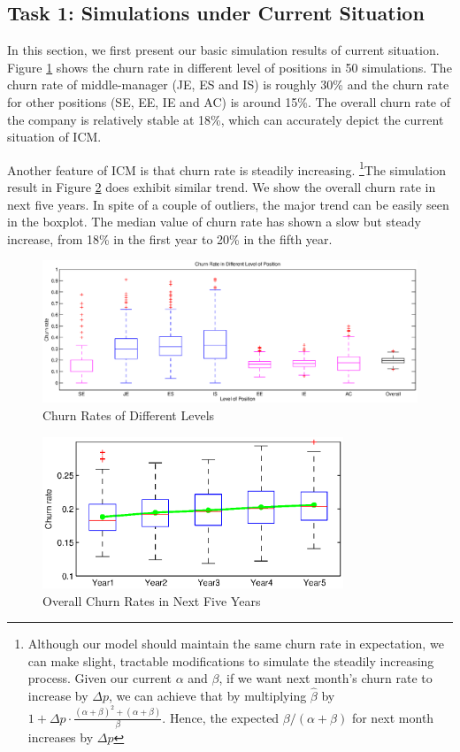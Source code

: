 \documentclass[tcn = 37075, sheet = false, abstract = false]{mcmthesis}
\begin{document}
\subsection{Task 1: Simulations under Current Situation}

In this section, we first present our basic simulation results of current situation. Figure \ref{fig:cdl} shows the churn rate in different level of positions in 50 simulations. The churn rate of middle-manager (JE, ES and IS) is roughly 30\% and the churn rate for other positions (SE, EE, IE and AC) is around 15\%. The overall churn rate of the company is relatively stable at 18\%, which can accurately depict the current situation of ICM.

Another feature of ICM is that churn rate is steadily increasing. \footnote{Although our model should maintain the same churn rate in expectation, we can make slight, tractable modifications to simulate the steadily increasing process. Given our current $\alpha$ and $\beta$, if we want next month's churn rate to increase by $\Delta p$, we can achieve that by multiplying $\hat{\beta}$ by  $1 + \Delta p \cdot \frac{(\alpha+\beta)^2+(\alpha+\beta)}{\beta}$. Hence, the expected $\beta / (\alpha + \beta)$ for next month increases by $\Delta p$}The simulation result in Figure \ref{fig:cnf} does exhibit similar trend. We show the overall churn rate in next five years. In spite of a couple of outliers, the major trend can be easily seen in the boxplot. The median value of churn rate has shown a slow but steady increase, from 18\% in the first year to 20\% in the fifth year.

\begin{figure}[htb!]
\includegraphics[width=16cm]{figures/task1_2.eps}
\caption{Churn Rates of Different Levels} 
\label{fig:cdl}
\end{figure}

\begin{figure}[htb!]
\centering
\includegraphics[width=9cm]{figures/task1.eps}
\caption{Overall Churn Rates in Next Five Years} 
\label{fig:cnf}
\end{figure}
\end{document}
